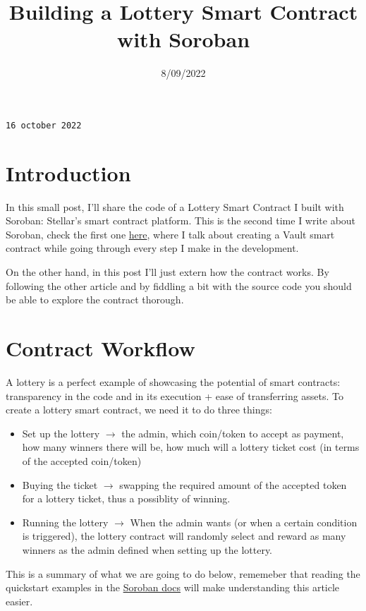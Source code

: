 \documentclass{article}
\title{Building a Lottery Smart Contract with Soroban}
\date{8/09/2022}
\begin{document}
\maketitle

\texttt{16 october 2022}

\section{Introduction}
In this small post, I'll share the code of a Lottery Smart Contract I built with Soroban: Stellar's smart contract platform. This is the second time I write about Soroban, check the first one \href{https://heytdep.github.io/comp_posts/6)--pub)--Vault-smart-contract-with-Soroban/post.html}{here}, where I talk about creating a Vault smart contract while going through every step I make in the development.

On the other hand, in this post I'll just extern how the contract works. By following the other article and by fiddling a bit with the source code you should be able to explore the contract thorough.

\section{Contract Workflow}
A lottery is a perfect example of showcasing the potential of smart contracts: transparency in the code and in its execution + ease of transferring assets. To create a lottery smart contract, we need it to do three things:

\begin{itemize}
\item Set up the lottery \( \rightarrow \) the admin, which coin/token to accept as payment, how many winners there will be, how much will a lottery ticket cost (in terms of the accepted coin/token)
\item Buying the ticket \( \rightarrow \) swapping the required amount of the accepted token for a lottery ticket, thus a possiblity of winning.
\item Running the lottery \( \rightarrow \) When the admin wants (or when a certain condition is triggered), the lottery contract will randomly select and reward as many winners as the admin defined when setting up the lottery.
\end{itemize}

This is a summary of what we are going to do below, rememeber that reading the quickstart examples in the \href{https://soroban.stellar.org/docs/}{Soroban docs} will make understanding this article easier.
\end{document}
